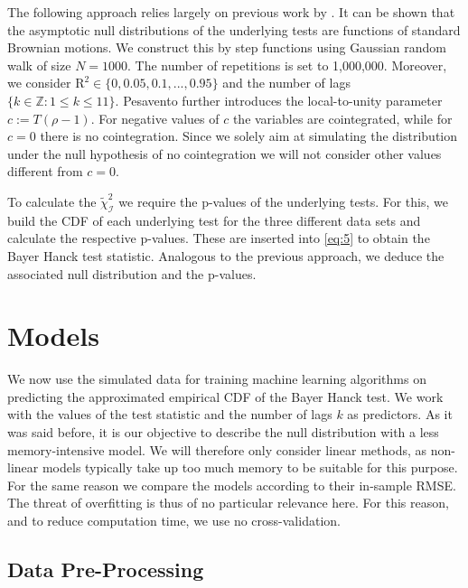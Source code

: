 \documentclass[12pt,a4paper]{article}
\begin{document}
The following approach relies largely on previous work by
\textcite{Pesavento_2004}. It can be shown that the asymptotic null
distributions of the underlying tests are functions of standard Brownian
motions. We construct this by step functions using Gaussian random walk
of size \(N = 1000\). The number of repetitions is set to 1,000,000.
Moreover, we consider \(\text{R}^2 \in \{0, 0.05, 0.1, ..., 0.95\}\) and
the number of lags \(\{k \in \mathbb{Z}: 1 \leq k \leq 11\}\). Pesavento
further introduces the local-to-unity parameter \(c:= T(\rho-1)\). For
negative values of \(c\) the variables are cointegrated, while for
\(c = 0\) there is no cointegration. Since we solely aim at simulating
the distribution under the null hypothesis of no cointegration we will
not consider other values different from \(c = 0\).

To calculate the \(\tilde{\chi}^2_{\mathcal{I}}\) we require the
p-values of the underlying tests. For this, we build the \ac{CDF} of
each underlying test for the three different data sets and calculate the
respective p-values. These are inserted into \eqref{eq:5} to obtain the
Bayer Hanck test statistic. Analogous to the previous approach, we
deduce the associated null distribution and the p-values.

\hypertarget{models}{%
\section{Models}\label{models}}

We now use the simulated data for training machine learning algorithms
on predicting the approximated empirical \ac{CDF} of the Bayer Hanck
test. We work with the values of the test statistic and the number of
lags \(k\) as predictors. As it was said before, it is our objective to
describe the null distribution with a less memory-intensive model. We
will therefore only consider linear methods, as non-linear models
typically take up too much memory to be suitable for this purpose. For
the same reason we compare the models according to their in-sample
\ac{RMSE}. The threat of overfitting is thus of no particular relevance
here. For this reason, and to reduce computation time, we use no
cross-validation.

\hypertarget{data-pre-processing}{%
\subsection{Data Pre-Processing}\label{data-pre-processing}}
\end{document}
